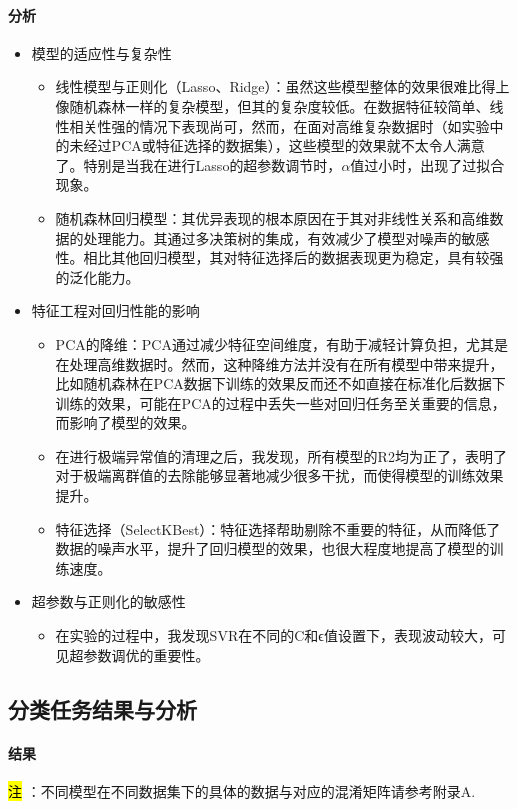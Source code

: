 \documentclass[10pt]{article}
\begin{document}
\paragraph{分析}  
\begin{itemize}
  \item 模型的适应性与复杂性
  \begin{itemize}
    \item 线性模型与正则化（Lasso、Ridge）：虽然这些模型整体的效果很难比得上像随机森林一样的复杂模型，但其的复杂度较低。在数据特征较简单、线性相关性强的情况下表现尚可，然而，在面对高维复杂数据时（如实验中的未经过PCA或特征选择的数据集），这些模型的效果就不太令人满意了。特别是当我在进行Lasso的超参数调节时，$\alpha$值过小时，出现了过拟合现象。
    \item 随机森林回归模型：其优异表现的根本原因在于其对非线性关系和高维数据的处理能力。其通过多决策树的集成，有效减少了模型对噪声的敏感性。相比其他回归模型，其对特征选择后的数据表现更为稳定，具有较强的泛化能力。
  \end{itemize}
  \item 特征工程对回归性能的影响
  \begin{itemize}
    \item PCA的降维：PCA通过减少特征空间维度，有助于减轻计算负担，尤其是在处理高维数据时。然而，这种降维方法并没有在所有模型中带来提升，比如随机森林在PCA数据下训练的效果反而还不如直接在标准化后数据下训练的效果，可能在PCA的过程中丢失一些对回归任务至关重要的信息，而影响了模型的效果。
    \item 在进行极端异常值的清理之后，我发现，所有模型的R2均为正了，表明了对于极端离群值的去除能够显著地减少很多干扰，而使得模型的训练效果提升。
    \item 特征选择（SelectKBest）：特征选择帮助剔除不重要的特征，从而降低了数据的噪声水平，提升了回归模型的效果，也很大程度地提高了模型的训练速度。
  \end{itemize}
  \item 超参数与正则化的敏感性
  \begin{itemize}
    \item 在实验的过程中，我发现SVR在不同的C和ϵ值设置下，表现波动较大，可见超参数调优的重要性。
  \end{itemize}
\end{itemize}

\subsection{分类任务结果与分析}
\paragraph{结果}
\noindent \hl{注 }：不同模型在不同数据集下的具体的数据与对应的混淆矩阵请参考附录A.
\end{document}
